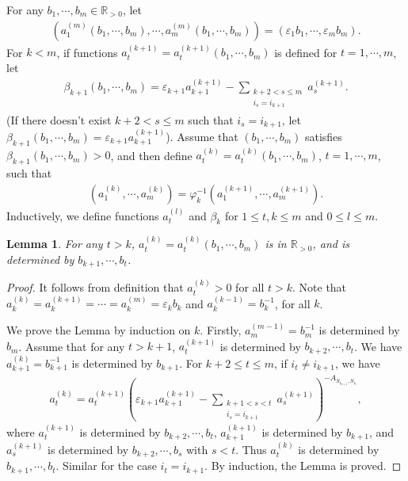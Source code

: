\documentclass[12pt]{amsart}
\newtheorem{lemma}[theorem]{Lemma}
\begin{document}
For any $b_1,\cdots,b_m\in \mathbb{R}_{>0}$, let 
\begin{align*}
    (a_1^{(m)}(b_1,\cdots,b_m),\cdots,a_m^{(m)}(b_1,\cdots,b_m))=(\varepsilon_1 b_1,\cdots,\varepsilon_m b_m).
\end{align*}
For $k<m$, if functions $a_t^{(k+1)}=a_t^{(k+1)}(b_1,\cdots,b_m)$ is defined for $t=1,\cdots,m$, let 
\begin{align*}
    \beta_{k+1}(b_1,\cdots,b_m)= \varepsilon_{k+1}a_{k+1}^{(k+1)} - \sum_{\substack{k+2<s\leq m\\i_s=i_{k+1}}} a_s^{(k+1)}.
\end{align*}
(If there doesn't exist $k+2 <s\leq m$ such that $i_s=i_{k+1}$, let $ \beta_{k+1}(b_1,\cdots,b_m)= \varepsilon_{k+1}a_{k+1}^{(k+1)} $).
Assume that $(b_1,\cdots,b_m)$ satisfies $\beta_{k+1}(b_1,\cdots,b_m)>0$, and then define $a_t^{(k)}=a_t^{(k)}(b_1,\cdots,b_m)$, $t=1,\cdots,m$, such that 
\begin{align*}
    (a_1^{(k)},\cdots,a_m^{(k)})=\varphi_{k}^{-1}(a_1^{(k+1)},\cdots,a_m^{(k+1)}).
\end{align*}
Inductively, we define functions $a_t^{(l)}$ and $\beta_k$ for $1\leq t,k\leq m$ and $0\leq l \leq m $.

\begin{lemma}\label{determine}
    For any $t>k$, $a_t^{(k)}=a_t^{(k)}(b_1,\cdots,b_m)$ is in $\mathbb{R}_{>0}$, and is determined by $b_{k+1},\cdots,b_t$.
\end{lemma}

\begin{proof}
    It follows from definition that $a_t^{(k)}>0$ for all $t>k$.
    Note that $a_k^{(k)}=a_k^{(k+1)}=\cdots=a_k^{(m)}=\varepsilon_k b_k$ and $a_k^{(k-1)}=b_k^{-1}$, for all $k$.

    We prove the Lemma by induction on $k$.
    Firstly, $a_m^{(m-1)}=b_m^{-1}$ is determined by $b_m$.
    Assume that for any $t>k+1$, $a_t^{(k+1)}$ is determined by $b_{k+2},\cdots,b_t$.
    We have $a_{k+1}^{(k)}=b_{k+1}^{-1}$ is determined by $b_{k+1}$. For $k+2 \leq t \leq m$, if $i_t\neq i_{k+1}$, we have 
\begin{align*}
    a_t^{(k)}=a_t^{(k+1)}(\varepsilon_{k+1} a_{k+1}^{(k+1)}-\sum_{\substack{k+1<s<t\\i_s=i_{k+1}}} a_s^{(k+1)} )^{-A_{S_{i_{k+1}},S_{i_t}}},
\end{align*}
where $a_t^{(k+1)}$ is determined by $b_{k+2},\cdots,b_t$, $a_{k+1}^{(k+1)}$ is determined by $b_{k+1}$, and $a_s^{(k+1)}$ is determined by $b_{k+2},\cdots,b_s$ with $s<t$.
Thus $a_t^{(k)}$ is determined by $b_{k+1},\cdots,b_t$.
Similar for the case $i_t= i_{k+1}$.
By induction, the Lemma is proved.
\end{proof}
\end{document}
